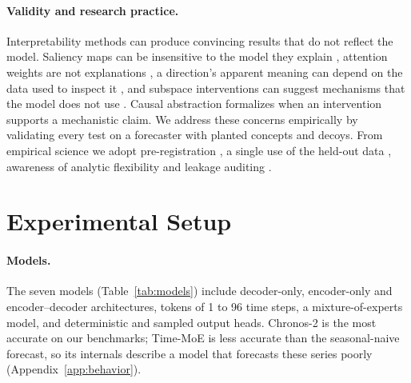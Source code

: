 \documentclass[twoside,11pt]{article}
\begin{document}
\paragraph{Validity and research practice.}
Interpretability methods can produce convincing results that do not reflect the model.
Saliency maps can be insensitive to the model they explain \citep{adebayo2018sanity}, attention weights are not explanations \citep{jain2019attention}, a direction's apparent meaning can depend on the data used to inspect it \citep{bolukbasi2021illusion}, and subspace interventions can suggest mechanisms that the model does not use \citep{makelov2024illusion}.
Causal abstraction \citep{geiger2021causal} formalizes when an intervention supports a mechanistic claim.
We address these concerns empirically by validating every test on a forecaster with planted concepts and decoys.
From empirical science we adopt pre-registration \citep{nosek2018preregistration}, a single use of the held-out data \citep{dwork2015reusable}, awareness of analytic flexibility \citep{gelman2014garden,simonsohn2020specification} and leakage auditing \citep{kapoor2023leakage}.

\section{Experimental Setup}
\label{sec:setup}

\paragraph{Models.}
\label{sec:models}
The seven models (Table~\ref{tab:models}) include decoder-only, encoder-only and encoder--decoder architectures, tokens of 1 to 96 time steps, a mixture-of-experts model, and deterministic and sampled output heads.
Chronos-2 is the most accurate on our benchmarks; Time-MoE is less accurate than the seasonal-naive forecast, so its internals describe a model that forecasts these series poorly (Appendix~\ref{app:behavior}).
\end{document}
